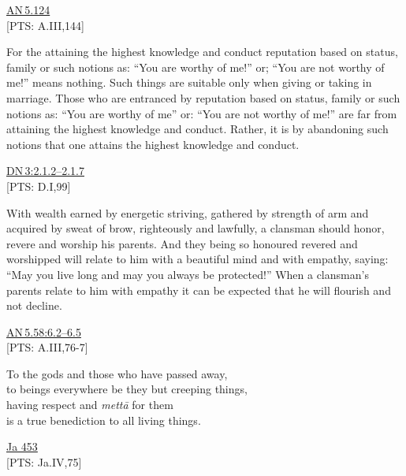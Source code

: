 \documentclass[10pt, openright]{book}
\begin{document}
\begin{flushright}
\href{https://suttacentral.net/an5.124/en/sujato}{AN 5.124}\\

[PTS: A.III,144]


\end{flushright}
For the attaining the highest knowledge and conduct reputation based on status, family or such notions as: “You are worthy of me!” or; “You are not worthy of me!” means nothing. Such things are suitable only when giving or taking in marriage. Those who are entranced by reputation based on status, family or such notions as: “You are worthy of me” or: “You are not worthy of me!” are far from attaining the highest knowledge and conduct. Rather, it is by abandoning such notions that one attains the highest knowledge and conduct.


\begin{flushright}
\href{https://suttacentral.net/dn3/en/sujato\#2.1.2}{DN 3:2.1.2–2.1.7}\\

[PTS: D.I,99]


\end{flushright}
With wealth earned by energetic striving, gathered by strength of arm and acquired by sweat of brow, righteously and lawfully, a clansman should honor, revere and worship his parents. And they being so honoured revered and worshipped will relate to him with a beautiful mind and with empathy, saying: “May you live long and may you always be protected!” When a clansman’s parents relate to him with empathy it can be expected that he will flourish and not decline.


\begin{flushright}
\href{https://suttacentral.net/an5.58/en/sujato\#6.2}{AN 5.58:6.2–6.5}\\

[PTS: A.III,76-7]


\end{flushright}


\begin{itemize}


To the gods and those who have passed away, \\ 
to beings everywhere be they but creeping things, \\ 
having respect and \textit{mettā} for them \\ 
is a true benediction to all living things.


\end{itemize}
\begin{flushright}
\href{https://suttacentral.net/ja453/en/rouse?reference=main/pts#pts-vp-pli75}{Ja 453}\\

[PTS: Ja.IV,75]


\end{flushright}
\end{document}
